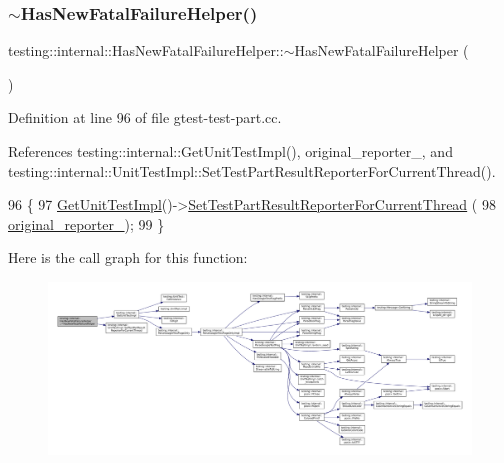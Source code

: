 \subsubsection{\texorpdfstring{$\sim$\+Has\+New\+Fatal\+Failure\+Helper()}{~HasNewFatalFailureHelper()}}
{\footnotesize\ttfamily testing\+::internal\+::\+Has\+New\+Fatal\+Failure\+Helper\+::$\sim$\+Has\+New\+Fatal\+Failure\+Helper (\begin{DoxyParamCaption}{ }\end{DoxyParamCaption})\hspace{0.3cm}{\ttfamily [virtual]}}



Definition at line 96 of file gtest-\/test-\/part.\+cc.



References testing\+::internal\+::\+Get\+Unit\+Test\+Impl(), original\+\_\+reporter\+\_\+, and testing\+::internal\+::\+Unit\+Test\+Impl\+::\+Set\+Test\+Part\+Result\+Reporter\+For\+Current\+Thread().


\begin{DoxyCode}
96                                                     \{
97   \hyperlink{namespacetesting_1_1internal_a9bd0caf5d16512de38b39599c13ee634}{GetUnitTestImpl}()->\hyperlink{classtesting_1_1internal_1_1UnitTestImpl_a1403fc10aebcc64479c5ee980c9b4eb4}{SetTestPartResultReporterForCurrentThread}
      (
98       \hyperlink{classtesting_1_1internal_1_1HasNewFatalFailureHelper_a9f8be46b6aa39666e4a8557f240629e5}{original\_reporter\_});
99 \}
\end{DoxyCode}
Here is the call graph for this function\+:
\nopagebreak
\begin{figure}[H]
\begin{center}
\leavevmode
\includegraphics[width=350pt]{classtesting_1_1internal_1_1HasNewFatalFailureHelper_a913b1bc7c372868c9b2dbb009044ee97_cgraph}
\end{center}
\end{figure}


